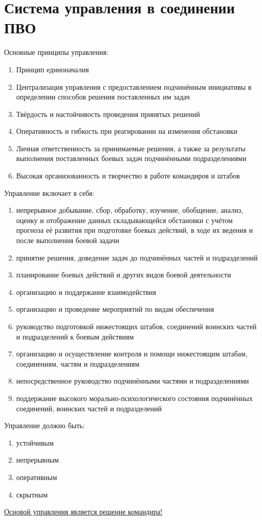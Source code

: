 \documentclass[a4paper,12pt]{article}
\begin{document}
	\section{\bf Система управления в соединении ПВО}
	Основные принципы управления:
	\begin{enumerate}
		\item Принцип единоначалия
		\item Централизация управления с предоставлением подчинённым инициативы в определении
		способов решения поставленных им задач
		\item Твёрдость и настойчивость проведения принятых решений
		\item Оперативность и гибкость при реагировании на изменения обстановки
		\item Личная ответственность за принимаемые решения, а также за результаты выполнения
		поставленных боевых задач подчинёнными подразделениями
		\item Высокая организованность и творчество в работе командиров и штабов
	\end{enumerate}
	Управление включает в себя:
	\begin{enumerate}
		\item непрерывное добывание, сбор, обработку, изучение, обобщение, анализ, оценку и 
		отображение данных складывающейся обстановки с учётом прогноза её развития при
		подготовке боевых действий, в ходе их ведения и после выполнения боевой задачи
		\item принятие решения, доведение задач до подчинённых частей и подразделений
		\item планирование боевых действий и других видов боевой деятельности
		\item организацию и поддержание взаимодействия
		\item организацию и проведение мероприятий по видам обеспечения
		\item руководство подготовкой нижестоящих штабов, соединений воинских частей и 
		подразделений к боевым действиям
		\item организацию и осуществление контроля и помощи нижестоящим штабам, соединениям, 
		частям и подразделениям
		\item непосредственное руководство подчинёнными частями и подразделениями
		\item поддержание высокого морально-психологического состояния подчинённых соединений, 
		воинских частей и подразделений
	\end{enumerate}
	Управление должно быть:
	\begin{enumerate}
		\item устойчивым
		\item непрерывным
		\item оперативным
		\item скрытным
	\end{enumerate} 
	\underline{Основой управления является решение командира!}
	
\end{document}
